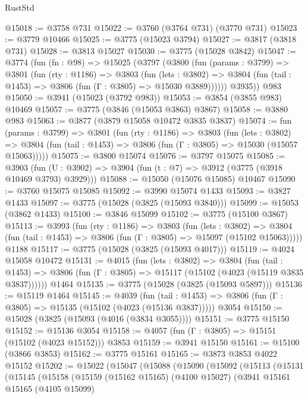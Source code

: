\begin{lexlean}{RustStd}
\begin{coremodule}
{\begin{coremodule}
{{{{{{{{{{{{{{{{{{{{{{{{{{{{{{{@15018 := @3758 @731
@15022 := @3760 (@3764 @731) (@3770 @731)
@15023 := @3779 @10466
@15025 := @3775 (@15023 @3794)
@15027 := @3817 (@3818 @731)
@15028 := @3813 @15027
@15030 := @3775 (@15028 @3842)
@15047 := @3774
    (fun (fn : @98) =>
    @15025
      (@3797
        (@3800
          (fun (params : @3799) =>
          @3801
            (fun (rty : @1186) =>
            @3803
              (fun (lets : @3802) =>
              @3804 (fun (tail : @1453) => @3806 (fun (Γ : @3805) => @15030 @3889))))))
        @3935))
    @983
@15050 := @3941 (@15023 (@3792 @983))
@15053 := @3854 (@3855 @983) @10469
@15057 := @3775 (@3846 (@15053 @3863) @3867)
@15058 := @3880 @983
@15063 := @3877 (@3879 @15058 @10472 @3835 @3837)
@15074 := fun (params : @3799) =>
  @3801
    (fun (rty : @1186) =>
    @3803
      (fun (lets : @3802) =>
      @3804 (fun (tail : @1453) => @3806 (fun (Γ : @3805) => @15030 (@15057 @15063)))))
@15075 := @3800 @15074
@15076 := @3797 @15075
@15085 := @3903
    (fun (U : @3902) => @3904 (fun (t : @7) => @3912 (@3775 (@3918 @10469 @3793) @3929)))
@15088 := @15050 (@15076 @15085) @10467
@15090 := @3760 @15075 @15085
@15092 := @3990 @15074 @1433
@15093 := @3827 @1433
@15097 := @3775 (@15028 (@3825 (@15093 @3840)))
@15099 := @15053 (@3862 @1433)
@15100 := @3846 @15099
@15102 := @3775 (@15100 @3867)
@15113 := @3993
    (fun (rty : @1186) =>
    @3803
      (fun (lets : @3802) =>
      @3804 (fun (tail : @1453) => @3806 (fun (Γ : @3805) => @15097 (@15102 @15063)))))
    @1188
@15117 := @3775 (@15028 (@3825 (@15093 @4017)))
@15119 := @4024 @15058 @10472
@15131 := @4015
    (fun (lets : @3802) =>
    @3804
      (fun (tail : @1453) =>
      @3806 (fun (Γ : @3805) => @15117 (@15102 (@4023 (@15119 @3835 @3837))))))
    @1464
@15135 := @3775 (@15028 (@3825 (@15093 @5897)))
@15136 := @15119 @1464
@15145 := @4039
    (fun (tail : @1453) => @3806 (fun (Γ : @3805) => @15135 (@15102 (@4023 (@15136 @3837)))))
    @3054
@15150 := @15028 (@3825 (@15093 (@4016 (@3834 @3055))))
@15151 := @3775 @15150
@15152 := @15136 @3054
@15158 := @4057 (fun (Γ : @3805) => @15151 (@15102 (@4023 @15152))) @3853
@15159 := @3941 @15150
@15161 := @15100 (@3866 @3853)
@15162 := @3775 @15161
@15165 := @3873 @3853 @4022 @15152
@15202 := @15022
    (@15047
      (@15088
        (@15090
          (@15092
            (@15113
              (@15131
                (@15145
                  (@15158
                    (@15159
                      (@15162 @15165)
                      (@4100 @15027)
                      (@3941
                        @15161
                        @15165
                        (@4105 @15099)
}}}}}}}}}}}}}}}}}}}}}}}}}}}}}}}
\end{coremodule}}
\end{coremodule}
\end{lexlean}
